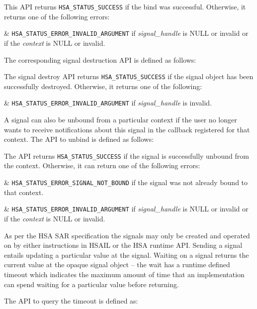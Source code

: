 

This API returns \texttt{HSA\_STATUS\_SUCCESS} if the bind was
successful. Otherwise, it returns one of the following errors:

\begin{easylist}
& \texttt{HSA\_STATUS\_ERROR\_INVALID\_ARGUMENT} if {\itshape
signal\_handle} is NULL or invalid or if the {\itshape context} is
NULL or invalid. 
\end{easylist}

The corresponding signal destruction API is defined as follows:


The signal destroy API returns \texttt{HSA\_STATUS\_SUCCESS} if the
signal object has been successfully destroyed. Otherwise, it returns
one of the following:

\begin{easylist}
& \texttt{HSA\_STATUS\_ERROR\_INVALID\_ARGUMENT} if {\itshape
signal\_handle} is invalid.
\end{easylist}

A signal can also be unbound from a particular context if the user
no longer wants to receive notifications about this signal in the
callback registered for that context. The API to unbind is defined
as follows:



The API returns \texttt{HSA\_STATUS\_SUCCESS} if the signal is
successfully unbound from the context. Otherwise, it can return one
of the following errors:

\begin{easylist}
& \texttt{HSA\_STATUS\_ERROR\_SIGNAL\_NOT\_BOUND} if the signal was
not already bound to that context.

& \texttt{HSA\_STATUS\_ERROR\_INVALID\_ARGUMENT} if {\itshape
signal\_handle} is NULL or invalid or if the {\itshape context} is
NULL or invalid. 
\end{easylist}

As per the HSA SAR specification the signals may only be created and
operated on by either instructions in HSAIL or the HSA runtime API.
Sending a signal entails updating a particular value at the signal.
Waiting on a signal returns the current value at the opaque signal
object -- the wait has a runtime defined timeout which indicates the
maximum amount of time that an implementation can spend waiting for
a particular value before returning. 

The API to query the timeout is defined as:

